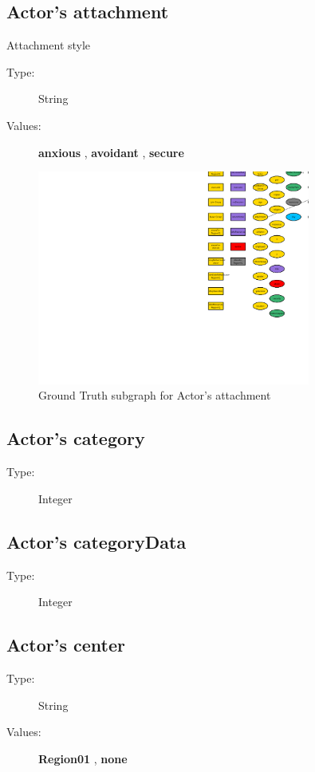 \documentclass{article}%
\begin{document}
%
\subsection{Actor's attachment}%
\label{subsec:Actor's attachment}%
Attachment style%
\begin{description}%
\item[Type:]%
String%
\item[Values:]%
\textbf{anxious}%
, %
\textbf{avoidant}%
, %
\textbf{secure}%
\end{description}%


\begin{figure}[ht]%
\centering%
\includegraphics[width=0.8\textwidth]{images/attachmentOfActor.png}%
\caption{Ground Truth subgraph for Actor's attachment}%
\end{figure}

%
\subsection{Actor's category}%
\label{subsec:Actor's category}%
\begin{description}%
\item[Type:]%
Integer%
\end{description}

%
\subsection{Actor's categoryData}%
\label{subsec:Actor's categoryData}%
\begin{description}%
\item[Type:]%
Integer%
\end{description}

%
\subsection{Actor's center}%
\label{subsec:Actor's center}%
\begin{description}%
\item[Type:]%
String%
\item[Values:]%
\textbf{Region01}%
, %
\textbf{none}%
\end{description}
\end{document}
